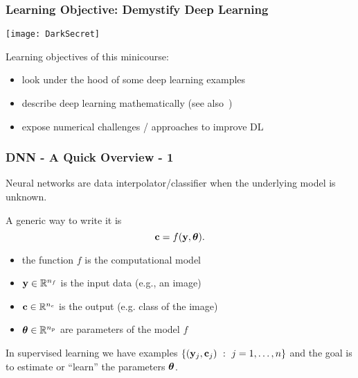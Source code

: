 \documentclass[12pt,fleqn]{beamer}
\begin{document}
\begin{frame}
	\frametitle{Learning Objective: Demystify Deep Learning}
	\begin{center}
		\texttt{[image: DarkSecret]}
	\end{center}
	
	Learning objectives of this minicourse:
	\begin{itemize}
		\item look under the hood of some deep learning examples
		\item describe deep learning mathematically (see also~\cite{HighamHigham2018})
		\item expose numerical challenges / approaches to improve DL
	\end{itemize}
\end{frame}

\begin{frame}\frametitle{DNN - A Quick Overview - 1}

Neural networks are data interpolator/classifier when the underlying model
is unknown.

\bigskip

A generic way to write it is
$$ {\bf c} = f({\bf y},{\boldsymbol \theta}). $$


\begin{itemize}
\item the function $f$ is the computational model
\item ${\bf y}\in\mathbb{R}^{n_f}$ is the input data (e.g., an image)
\item ${\bf c}\in\mathbb{R}^{n_c}$ is the output (e.g. class of the image)
\item ${\boldsymbol \theta}\in\mathbb{R}^{n_p}$ are parameters of the model $f$
\end{itemize}

In supervised learning we have examples $\{({\bf y}_j,{\bf c}_j) \ : \ j=1,\ldots,n\}$ and the goal
is to estimate or ``learn'' the parameters ${\boldsymbol \theta}$.

\end{frame}
\end{document}
